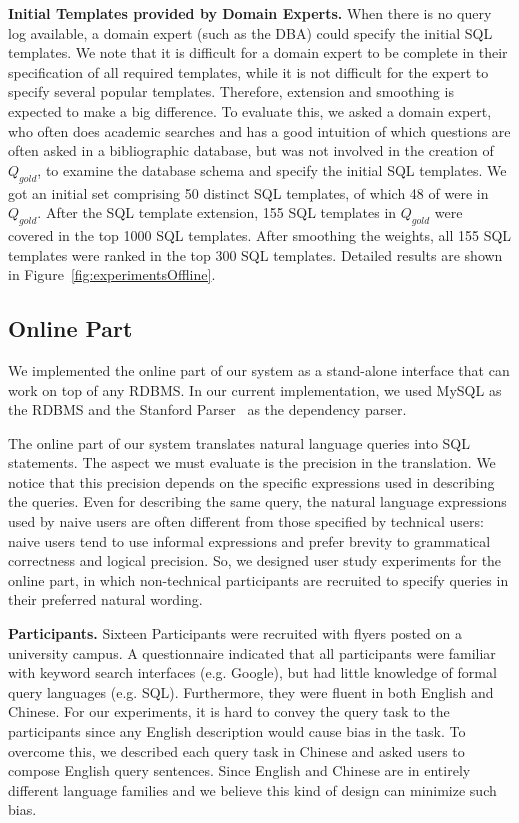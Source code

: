 \documentclass{vldb}
\begin{document}
\textbf{Initial Templates provided by Domain Experts.} When there is no query log available, a domain expert (such as the DBA) could specify the initial SQL templates. We note that it is difficult for a domain expert to be complete in their specification of all required templates, while it is not difficult for the expert to specify several popular templates.  Therefore, extension and smoothing is expected to make a big difference.  To evaluate this, we asked a domain expert, who often does academic searches and has a good intuition of which questions are often asked in a bibliographic database, but was not involved in the creation of $Q_{gold}$, to examine the database schema and specify the initial SQL templates. We got an initial set comprising 50 distinct SQL templates, of which 48 of were in $Q_{gold}$.  After the SQL template extension, 155 SQL templates in $Q_{gold}$ were covered in the top 1000 SQL templates. After smoothing the weights, all 155 SQL templates were ranked in the top 300 SQL templates.  Detailed results are shown in Figure~\ref{fig:experimentsOffline}.

\subsection{Online Part}
We implemented the online part of our system as a stand-alone interface that can work on top of any RDBMS.  In our current implementation, we used MySQL as the RDBMS and the Stanford Parser~\cite{Marneffe06generatingtyped} as the dependency parser.  

The online part of our system translates natural language queries into SQL statements.  The aspect we must evaluate is the precision in the translation.  We notice that this precision depends on the specific expressions used in describing the queries.  Even for describing the same query, the natural language expressions used by naive users are often different from those specified by technical users: naive users tend to use informal expressions and prefer brevity to grammatical correctness and logical precision.  So, we designed user study experiments for the online part, in which non-technical participants are recruited to specify queries in their preferred natural wording.  

\textbf{Participants.}
Sixteen Participants were recruited with flyers posted on a university campus. A questionnaire indicated that all participants were familiar with keyword search interfaces (e.g. Google), but had little knowledge of formal query languages (e.g. SQL).  Furthermore, they were fluent in both English and Chinese.  For our experiments, it is hard to convey the query task to the participants since any English description would cause bias in the task.  To overcome this, we described each query task in Chinese and asked users to compose English query sentences.  Since English and Chinese are in entirely different language families and we believe this kind of design can minimize such bias.  
\end{document}
